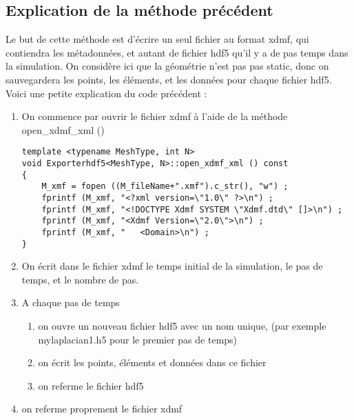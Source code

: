 \documentclass[10pt]{article}
\begin{document}
\subsection {Explication de la méthode précédent}
Le but de cette méthode est d'écrire un seul fichier au format xdmf, qui contiendra les métadonnées, et autant de fichier hdf5 qu'il y a de pas temps dans la simulation.
On considère ici que la géométrie n'est pas pas static, donc on sauvegardera les points, les éléments, et les données pour chaque fichier hdf5.
Voici une petite explication du code précédent :
\begin{enumerate}
\item On commence par ouvrir le fichier xdmf à l'aide de la méthode open\_xdmf\_xml ()
\begin{lstlisting}
template <typename MeshType, int N>
void Exporterhdf5<MeshType, N>::open_xdmf_xml () const
{
    M_xmf = fopen ((M_fileName+".xmf").c_str(), "w") ;
    fprintf (M_xmf, "<?xml version=\"1.0\" ?>\n") ;
    fprintf (M_xmf, "<!DOCTYPE Xdmf SYSTEM \"Xdmf.dtd\" []>\n") ;
    fprintf (M_xmf, "<Xdmf Version=\"2.0\">\n") ;
    fprintf (M_xmf, "   <Domain>\n") ;
}
\end{lstlisting}
\item On écrit dans le fichier xdmf le temps initial de la simulation, le pas de temps, et le nombre de pas.
\item A chaque pas de temps 
\begin{enumerate}
\item on ouvre un nouveau fichier hdf5 avec un nom unique, (par exemple mylaplacian1.h5 pour le premier pas de temps)
\item on écrit les points, éléments et données dans ce fichier
\item on referme le fichier hdf5
\end{enumerate}
\item on referme proprement le fichier xdmf
\end{enumerate}
\end{document}
